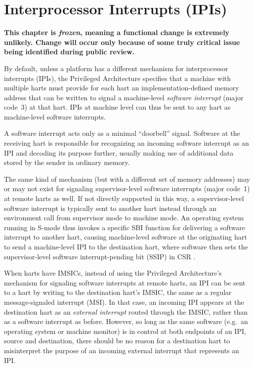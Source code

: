 
\chapter{Interprocessor Interrupts (IPIs)}
\label{ch:IPIs}

\textbf{%
This chapter is \emph{frozen}, meaning
a functional change is extremely unlikely.
Change will occur only because of some truly critical issue
being identified during public review.%
}
\bigskip

By default, unless a platform has a different mechanism for
interprocessor interrupts (IPIs), the {\RISCV} Privileged Architecture
specifies that a machine with multiple harts must provide for each hart
an implementation-defined memory address that can be written to signal
a machine-level \emph{software interrupt} (major code~3) at that hart.
IPIs at machine level can thus be sent to any hart as machine-level
software interrupts.

\begin{commentary}
A {\RISCV} software interrupt acts only as a minimal ``doorbell''
signal.
Software at the receiving hart is responsible for recognizing an
incoming software interrupt as an IPI and decoding its purpose further,
usually making use of additional data stored by the sender in ordinary
memory.
\end{commentary}

The same kind of mechanism (but with a different set of memory addresses) may
or may not exist for signaling supervisor-level software interrupts
(major code~1) at remote harts as well.
If not directly supported in this way, a supervisor-level software
interrupt is typically sent to another hart instead through an environment call
from supervisor mode to machine mode.
An operating system running in \mbox{S-mode} thus invokes a specific
SBI function for delivering a software interrupt to another hart,
causing machine-level software at the originating hart to send a
machine-level IPI to the destination hart, where software then sets the
supervisor-level software interrupt-pending bit (SSIP) in CSR .

When harts have IMSICs, instead of using the Privileged Architecture's
mechanism for signaling software interrupts at remote harts, an IPI
can be sent to a hart by writing to the destination hart's IMSIC, the
same as a regular message-signaled interrupt (MSI)\@.
In that case, an incoming IPI appears at the destination hart as an
\emph{external interrupt} routed through the IMSIC, rather than as a
software interrupt as before.
However, so long as the same software (e.g.\ an operating system or
machine monitor) is in control at both endpoints of an IPI, source
and destination, there should be no reason for a destination hart
to misinterpret the purpose of an incoming external interrupt that
represents an IPI.


